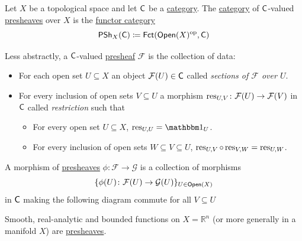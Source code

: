 \documentclass[../../main]{subfiles}
\begin{document}
\begin{definition}[Presheaf]\label{def:presheaf}
  Let \(X\) be a topological space and let \(\mathsf{C}\) be a \hyperref[def:category]{category}.
  The \hyperref[def:category]{category} of \(\mathsf{C}\)-valued \hyperref[def:presheaf]{presheaves} over \(X\) is the \hyperref[def:functor-category]{functor category}
  \begin{equation*}
    \mathsf{PSh}_{X}(\mathsf{C}) \coloneq \mathsf{Fct}(\mathsf{Open}(X)^{\operatorname*{op}}, \mathsf{C})
  \end{equation*}

  Less abstractly, a \(\mathsf{C}\)-valued \hyperref[def:presheaf]{presheaf} \(\mathcal{F}\) is the collection of data:
  \begin{itemize}
    \item For each open set \(U \subseteq X\) an object \(\mathcal{F}(U) \in \mathsf{C}\) called \textit{sections of \(\mathcal{F}\) over \(U\)}.
    \item For every inclusion of open sets \(V \subseteq U\) a morphism \(\operatorname{res}_{U, V}\colon \mathcal{F}(U) \to \mathcal{F}(V)\) in \(\mathsf{C}\) called \textit{restriction} such that
          \begin{itemize}
            \item For every open set \(U \subseteq X\), \(\res_{U, U} = \id_{U}\).
            \item For every inclusion of open sets \(W \subseteq V \subseteq U\), \(\operatorname{res}_{U, V} \circ \operatorname{res}_{V, W} = \operatorname{res}_{U, W}\).
          \end{itemize}
  \end{itemize}
  A morphism of \hyperref[def:presheaf]{presheaves} \(\phi: \mathcal{F} \to \mathcal{G}\) is a collection of morphisms
  \begin{equation*}
    \{\phi(U)\colon \mathcal{F}(U) \to \mathcal{G}(U)\}_{U \in \mathsf{Open}(X)}
  \end{equation*}
  in \(\mathsf{C}\) making the following diagram commute for all \(V \subseteq U\)
  \begin{center}
  \end{center}
\end{definition}

\begin{example}
  Smooth, real-analytic and bounded functions on \(X = \mathbb{R}^{n}\) (or more generally in a manifold \(X\)) are \hyperref[def:presheaf]{presheaves}.
\end{example}
\end{document}
